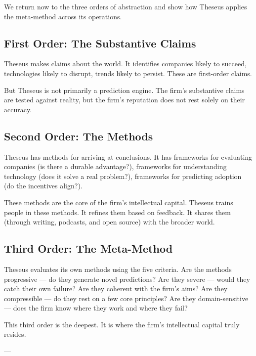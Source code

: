 \documentclass[11pt,letterpaper]{article}
\begin{document}
We return now to the three orders of abstraction and show how Theseus applies the meta-method across its operations.

\subsection*{First Order: The Substantive Claims}

Theseus makes claims about the world. It identifies companies likely to succeed, technologies likely to disrupt, trends likely to persist. These are first-order claims.

But Theseus is not primarily a prediction engine. The firm's substantive claims are tested against reality, but the firm's reputation does not rest solely on their accuracy.

\subsection*{Second Order: The Methods}

Theseus has methods for arriving at conclusions. It has frameworks for evaluating companies (is there a durable advantage?), frameworks for understanding technology (does it solve a real problem?), frameworks for predicting adoption (do the incentives align?).

These methods are the core of the firm's intellectual capital. Theseus trains people in these methods. It refines them based on feedback. It shares them (through writing, podcasts, and open source) with the broader world.

\subsection*{Third Order: The Meta-Method}

Theseus evaluates its own methods using the five criteria. Are the methods progressive — do they generate novel predictions? Are they severe — would they catch their own failure? Are they coherent with the firm's aims? Are they compressible — do they rest on a few core principles? Are they domain-sensitive — does the firm know where they work and where they fail?

This third order is the deepest. It is where the firm's intellectual capital truly resides.

---

\newpage

\end{document}
